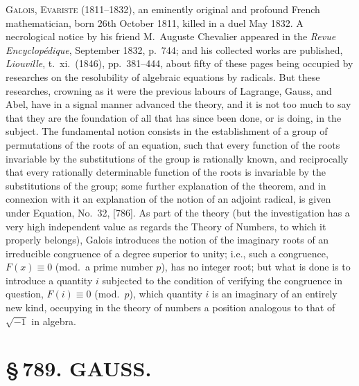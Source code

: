 \documentclass[11pt,a4paper]{article}
\begin{document}
\textsc{Galois, Evariste} (1811--1832), an eminently original and profound French mathematician, born 26th October 1811, killed in a duel May 1832. A necrological notice by his friend M.\ Auguste Chevalier appeared in the \textit{Revue Encyclop\'{e}dique}, September 1832, p.~744; and his collected works are published, \textit{Liouville}, t.~xi.\ (1846), pp.~381--444, about fifty of these pages being occupied by researches on the resolubility of algebraic equations by radicals. But these researches, crowning as it were the previous labours of Lagrange, Gauss, and Abel, have in a signal manner advanced the theory, and it is not too much to say that they are the foundation of all that has since been done, or is doing, in the subject. The fundamental notion consists in the establishment of a group of permutations of the roots of an equation, such that every function of the roots invariable by the substitutions of the group is rationally known, and reciprocally that every rationally determinable function of the roots is invariable by the substitutions of the group; some further explanation of the theorem, and in connexion with it an explanation of the notion of an adjoint radical, is given under Equation, No.~32, [786]. As part of the theory (but the investigation has a very high independent value as regards the Theory of Numbers, to which it properly belongs), Galois introduces the notion of the imaginary roots of an irreducible congruence of a degree superior to unity; i.e., such a congruence, $F(x) \equiv 0$ (mod.\ a prime number $p$), has no integer root; but what is done is to introduce a quantity $i$ subjected to the condition of verifying the congruence in question, $F(i) \equiv 0$ (mod.\ $p$), which quantity $i$ is an imaginary of an entirely new kind, occupying in the theory of numbers a position analogous to that of $\sqrt{-1}$ in algebra.

\newpage
\section*{\S\,789. GAUSS.}


\smallskip
\end{document}
